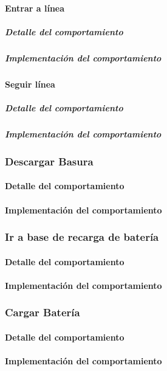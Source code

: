 \paragraph{Entrar a l\'inea}
\label{enter_line}
\subparagraph{Detalle del comportamiento}
\subparagraph{Implementaci\'on del comportamiento}

\paragraph{Seguir l\'inea}
\label{follow_line}
\subparagraph{Detalle del comportamiento}
\subparagraph{Implementaci\'on del comportamiento}

\subsubsection{Descargar Basura}
\label{unload_garbage}
\paragraph{Detalle del comportamiento}
\paragraph{Implementaci\'on del comportamiento}

\subsubsection{Ir a base de recarga de bater\'ia}
\label{go_to_recharge}
\paragraph{Detalle del comportamiento}
\paragraph{Implementaci\'on del comportamiento}

\subsubsection{Cargar Bater\'ia}
\label{recharge_battery}
\paragraph{Detalle del comportamiento}
\paragraph{Implementaci\'on del comportamiento}

